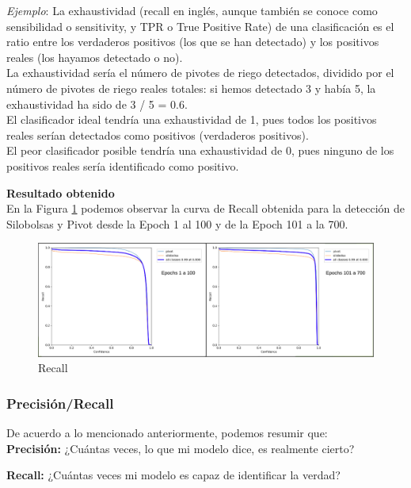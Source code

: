 \textit{Ejemplo}:
La exhaustividad (recall en inglés, aunque también se conoce como sensibilidad o sensitivity, y TPR o True Positive Rate) de una clasificación es el ratio entre los verdaderos positivos (los que se han detectado) y los positivos reales (los hayamos detectado o no).\\
La exhaustividad sería el número de pivotes de riego detectados, dividido por el número de pivotes de riego reales totales: si hemos detectado 3 y había 5, la exhaustividad ha sido de 3 / 5 = 0.6. \\
El clasificador ideal tendría una exhaustividad de 1, pues todos los positivos reales serían detectados como positivos (verdaderos positivos).\\
El peor clasificador posible tendría una exhaustividad de 0, pues ninguno de los positivos reales sería identificado como positivo.

\newpage
\textbf{Resultado obtenido}\\
 
En la Figura \ref{fig:recall} podemos observar la curva de Recall obtenida para la detección de Silobolsas y Pivot desde la Epoch 1 al 100 y de la Epoch 101 a la 700.

\begin{figure}[h!]
    \centering
    \includegraphics[width=1\textwidth]{img/Recall.png}
    \caption{Recall}
    \label{fig:recall}
\end{figure}

\subsubsection{Precisión/Recall}

De acuerdo a lo mencionado anteriormente, podemos resumir que:\\

\textbf{Precisión:} ¿Cuántas veces, lo que mi modelo dice, es realmente cierto?

\textbf{Recall:} ¿Cuántas veces mi modelo es capaz de identificar la verdad?\\

